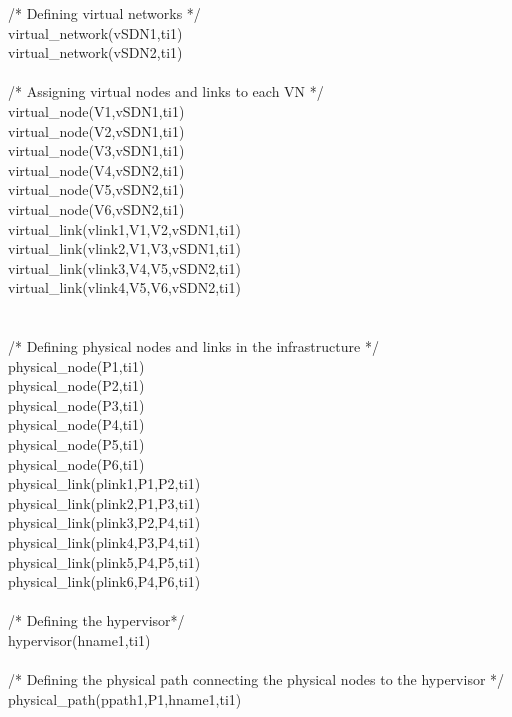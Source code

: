 \begin{myformula}
/* Defining virtual networks */\\
virtual\_network(vSDN1,ti1)\\
virtual\_network(vSDN2,ti1)\\
\textbf{\\}
/* Assigning virtual nodes and links to each VN */\\
virtual\_node(V1,vSDN1,ti1)\\
virtual\_node(V2,vSDN1,ti1)\\
virtual\_node(V3,vSDN1,ti1)\\
virtual\_node(V4,vSDN2,ti1)\\
virtual\_node(V5,vSDN2,ti1)\\
virtual\_node(V6,vSDN2,ti1)\\
virtual\_link(vlink1,V1,V2,vSDN1,ti1)\\
virtual\_link(vlink2,V1,V3,vSDN1,ti1)\\
virtual\_link(vlink3,V4,V5,vSDN2,ti1)\\
virtual\_link(vlink4,V5,V6,vSDN2,ti1)\\
\textbf{\\}
\textbf{\\}
/* Defining physical nodes and links in the infrastructure */\\
physical\_node(P1,ti1)\\
physical\_node(P2,ti1)\\
physical\_node(P3,ti1)\\
physical\_node(P4,ti1)\\
physical\_node(P5,ti1)\\
physical\_node(P6,ti1)\\
physical\_link(plink1,P1,P2,ti1)\\
physical\_link(plink2,P1,P3,ti1)\\
physical\_link(plink3,P2,P4,ti1)\\
physical\_link(plink4,P3,P4,ti1)\\
physical\_link(plink5,P4,P5,ti1)\\
physical\_link(plink6,P4,P6,ti1)\\
\textbf{\\}
/* Defining the hypervisor*/\\
hypervisor(hname1,ti1)\\
\textbf{\\}
/* Defining the physical path connecting the physical nodes to the hypervisor */\\
physical\_path(ppath1,P1,hname1,ti1)\\

\end{myformula}
